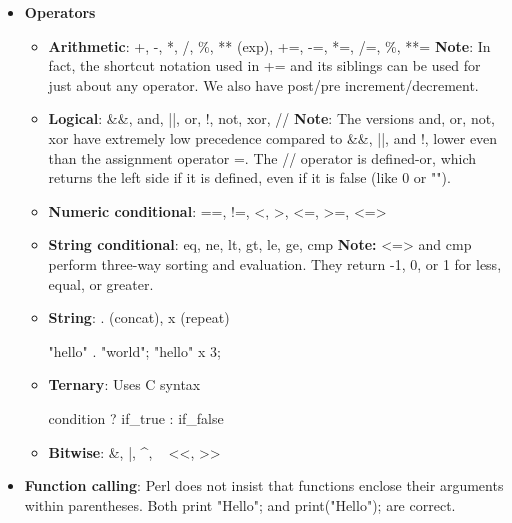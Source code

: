 \documentclass{report}
\begin{document}
    \pagebreak 
    \begin{itemize}
        \item \textbf{Operators}        
            \begin{itemize}
                \item \textbf{Arithmetic}: +, -, *, /, \%, ** (exp), +=, -=, *=, /=, \%, **=
                    \bigbreak \noindent 
                    \textbf{Note}: In fact, the shortcut notation used in += and its siblings can be used for just about any operator. 
                    \bigbreak \noindent 
                    We also have post/pre increment/decrement.
                \item \textbf{Logical}: \&\&, and, ||, or, !, not, xor, //
                    \bigbreak \noindent 
                    \textbf{Note}: The versions and, or, not, xor have extremely low precedence compared to \&\&, ||, and !, lower even than the assignment operator =. 
                    \bigbreak \noindent 
                    The // operator is defined-or, which returns the left side if it is defined, even if it is false (like 0 or "").
                \item \textbf{Numeric conditional}: ==, !=, <, >, <=, >=, <=>
                \item \textbf{String conditional}: eq, ne, lt, gt, le, ge, cmp
                    \bigbreak \noindent 
                    \textbf{Note:} <=> and cmp perform three-way sorting and evaluation. They return -1, 0, or 1 for less, equal, or greater.
                \item \textbf{String}:  . (concat), x (repeat)
                    \bigbreak \noindent 
                    \begin{perlcode}
                    "hello" . "world";
                    "hello" x 3;
                    \end{perlcode}
                \item \textbf{Ternary}: Uses C syntax
                    \bigbreak \noindent 
                    \begin{perlcode}
                    condition ? if_true : if_false
                    \end{perlcode}
                \item \textbf{Bitwise}: \&, |, ^, \string~ <<, >>
            \end{itemize}
        \item \textbf{Function calling}: Perl does not insist that functions enclose their arguments within parentheses. Both print "Hello"; and print("Hello"); are correct. 

\end{itemize}
\end{document}
